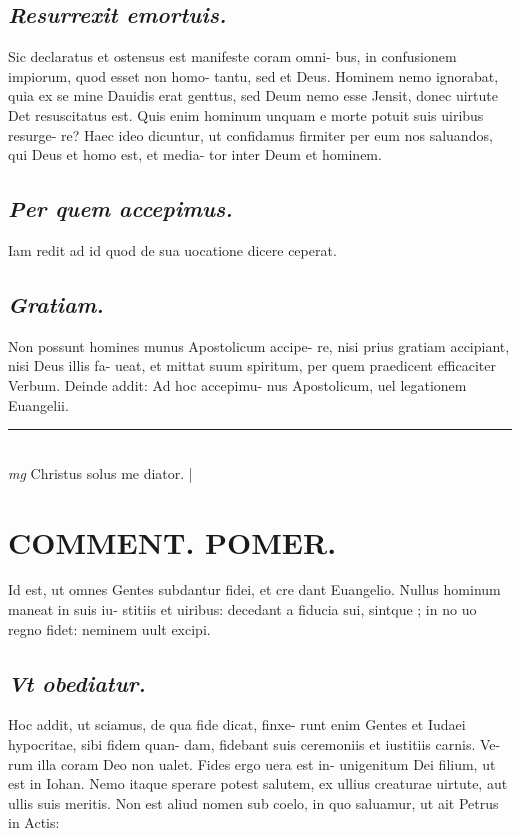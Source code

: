 \documentclass{article}
\begin{document}
\begin{pages}
\subsection*{\textit{Resurrexit emortuis. }}\pstart Sic declaratus et ostensus est manifeste coram omni- bus, in confusionem impiorum, quod esset non homo- tantu, sed et Deus. Hominem nemo ignorabat, quia ex se mine Dauidis erat genttus, sed Deum nemo esse Jensit, donec uirtute Det resuscitatus est. Quis enim hominum unquam e morte potuit suis uiribus resurge- re? Haec ideo dicuntur, ut confidamus firmiter per eum nos saluandos, qui Deus et homo est, et media- tor inter Deum et hominem.   \pend
{}
{}
\subsection*{\textit{Per quem accepimus. }}\pstart Iam redit ad id quod de sua uocatione dicere ceperat.   \pend
{}
{}
\subsection*{\textit{Gratiam. }}\pstart Non possunt homines munus Apostolicum accipe- re, nisi prius gratiam accipiant, nisi Deus illis fa- ueat, et mittat suum spiritum, per quem praedicent efficaciter Verbum. Deinde addit: Ad hoc accepimu- nus Apostolicum, uel legationem Euangelii.   \pend
\vspace{0.5cm}\noindent
\vspace{0.2cm}\rule{1cm}{0.2pt}\\ 
\hspace{0.2cm}\textit{mg}
\footnotesize Christus solus me diator.  
\normalsize| 
\section*{COMMENT. POMER.  }\pstart Id est, ut omnes Gentes subdantur fidei, et cre dant Euangelio. Nullus hominum maneat in suis iu- stitiis et uiribus: decedant a fiducia sui, sintque ; in no uo regno fidet: neminem uult excipi.  \pend
{}
{}
\subsection*{\textit{Vt obediatur. }}\pstart Hoc addit, ut sciamus, de qua fide dicat, finxe- runt enim Gentes et Iudaei hypocritae, sibi fidem quan- dam, fidebant suis ceremoniis et iustitiis carnis. Ve- rum illa coram Deo non ualet. Fides ergo uera est in- unigenitum Dei filium, ut est in Iohan. Nemo itaque  sperare potest salutem, ex ullius creaturae uirtute, aut ullis suis meritis. Non est aliud nomen sub coelo, in quo saluamur, ut ait Petrus in Actis:  \pend
{}
{}

\end{pages}
\end{document}
